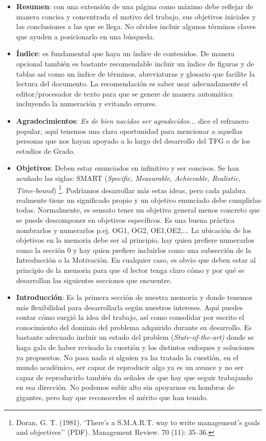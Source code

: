 {\begin{itemize}
    \item \textbf{Resumen}: con una extensión de una página como máximo debe reflejar de manera concisa y concentrada el motivo del trabajo, sus objetivos iniciales y las conclusiones a las que se llega. No olvides incluir algunos términos claves que ayuden a posicionarlo en una búsqueda.
    \item \textbf{Índice}: es fundamental que haya un índice de contenidos. De manera opcional también es bastante recomendable incluir un índice de figuras y de tablas así como un índice de términos, abreviaturas y glosario que facilite la lectura del documento. La recomendación es saber usar adecuadamente el editor/procesador de texto para que se genere de manera automática incluyendo la numeración y evitando errores.
    \item \textbf{Agradecimientos}: {\it Es de bien nacidos ser agradecidos...} dice el refranero popular, aquí tenemos una clara oportunidad para mencionar a aquellas personas que nos hayan apoyado a lo largo del desarrollo del TFG o de los estudios de Grado. 
    \item \textbf{Objetivos}: Deben estar enunciados en infinitivo y ser concisos. Se han acuñado las siglas: SMART (\textit{Specific, Measurable, Achievable, Realistic, Time-bound}) \footnote{Doran, G. T. (1981). `There's a S.M.A.R.T. way to write management's goals and objectives'' (PDF). Management Review. 70 (11): 35–36.}. Podríamos desarrollar más estas ideas, pero cada palabra realmente tiene un significado propio y un objetivo enunciado debe cumplirlas todas. Normalmente, es sensato tener un objetivo general menos concreto que se puede descomponer en objetivos específicos. Es una buena práctica nombrarlos y numerarlos p.ej. OG1, OG2, OE1,OE2,... La ubicación de los objetivos en la memoria debe ser al principio, hay quien prefiere numerarlos como la sección 0 y hay quien prefiere incluirlos como una subsección de la Introducción o la Motivación. En cualquier caso, es obvio que deben estar al principio de la memoria para que el lector tenga claro cómo y por qué se desarrollan las siguientes secciones que encuentre.

    \item \textbf{Introducción}: Es la primera sección de nuestra memoria y donde tenemos más flexibilidad para desarrollarla según nuestros intereses. Aquí puedes contar cómo surgió la idea del trabajo, así como consolidar por escrito el conocimiento del dominio del problema adquirido durante su desarrollo. Es bastante adecuado incluir un estado del problem (\textit{State-of-the-art)} donde se haga gala de haber revisado la cuestión y los distintos enfoques y soluciones ya propuestos. No pasa nada si alguien ya ha tratado la cuestión, en el mundo académico, ser capaz de reproducir algo ya es un avance y no ser capaz de reproducirlo también da señales de que hay que seguir trabajando en esa dirección. No podemos subir alto sin apoyarnos en hombros de gigantes, pero hay que reconocerles el mérito que han tenido.


\end{itemize}}
